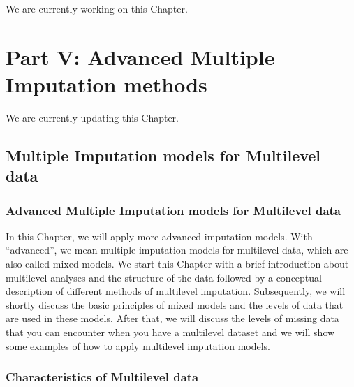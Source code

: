 \documentclass[]{book}
\begin{document}
We are currently working on this Chapter.

\part{Part V: Advanced Multiple Imputation
methods}\label{part-part-v-advanced-multiple-imputation-methods}

We are currently updating this Chapter.

\chapter{Multiple Imputation models for Multilevel
data}\label{multiple-imputation-models-for-multilevel-data}

\section{Advanced Multiple Imputation models for Multilevel
data}\label{advanced-multiple-imputation-models-for-multilevel-data}

In this Chapter, we will apply more advanced imputation models. With
``advanced'', we mean multiple imputation models for multilevel data,
which are also called mixed models. We start this Chapter with a brief
introduction about multilevel analyses and the structure of the data
followed by a conceptual description of different methods of multilevel
imputation. Subsequently, we will shortly discuss the basic principles
of mixed models and the levels of data that are used in these models.
After that, we will discuss the levels of missing data that you can
encounter when you have a multilevel dataset and we will show some
examples of how to apply multilevel imputation models.

\section{Characteristics of Multilevel
data}\label{characteristics-of-multilevel-data}
\end{document}
